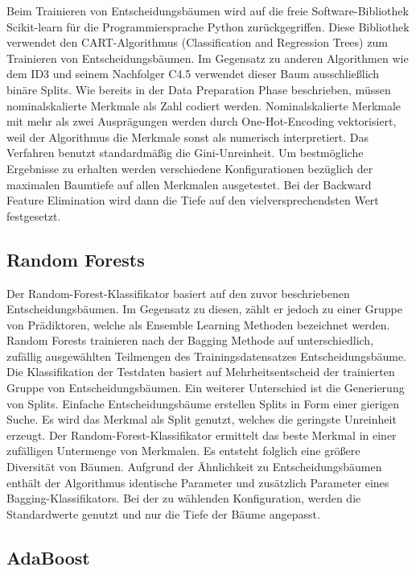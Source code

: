Beim Trainieren von Entscheidungsbäumen wird auf die freie Software-Bibliothek Scikit-learn für die Programmiersprache Python zurückgegriffen. Diese Bibliothek verwendet den CART-Algorithmus (Classification and Regression Trees) zum Trainieren von Entscheidungsbäumen. Im Gegensatz zu anderen Algorithmen wie dem ID3 und seinem Nachfolger C4.5 verwendet dieser Baum ausschließlich binäre Splits. Wie bereits in der Data Preparation Phase beschrieben, müssen nominalskalierte Merkmale als Zahl codiert werden. Nominalskalierte Merkmale mit mehr als zwei Ausprägungen werden durch One-Hot-Encoding vektorisiert, weil der Algorithmus die Merkmale sonst als numerisch interpretiert. Das Verfahren benutzt standardmäßig die Gini-Unreinheit. Um bestmögliche Ergebnisse zu erhalten werden verschiedene Konfigurationen bezüglich der maximalen Baumtiefe auf allen Merkmalen ausgetestet. Bei der Backward Feature Elimination wird dann die Tiefe auf den vielversprechendsten Wert festgesetzt.

\subsection{Random Forests}
\label{sec:RF}

Der Random-Forest-Klassifikator basiert auf den zuvor beschriebenen Entscheidungsbäumen. Im Gegensatz zu diesen, zählt er jedoch zu einer Gruppe von Prädiktoren, welche als Ensemble Learning Methoden bezeichnet werden. Random Forests trainieren nach der Bagging Methode auf unterschiedlich, zufällig ausgewählten Teilmengen des Trainingsdatensatzes Entscheidungsbäume. Die Klassifikation der Testdaten basiert auf Mehrheitsentscheid der trainierten Gruppe von Entscheidungsbäumen. Ein weiterer Unterschied ist die Generierung von Splits. Einfache Entscheidungsbäume erstellen Splits in Form einer gierigen Suche. Es wird das Merkmal als Split genutzt, welches die geringste Unreinheit erzeugt. Der Random-Forest-Klassifikator ermittelt das beste Merkmal in einer zufälligen Untermenge von Merkmalen. Es entsteht folglich eine größere Diversität von Bäumen. Aufgrund der Ähnlichkeit zu Entscheidungsbäumen enthält der Algorithmus identische Parameter und zusätzlich Parameter eines Bagging-Klassifikators. Bei der zu wählenden Konfiguration, werden die Standardwerte genutzt und nur die Tiefe der Bäume angepasst.

\subsection{AdaBoost}
\label{sec:Ada}

